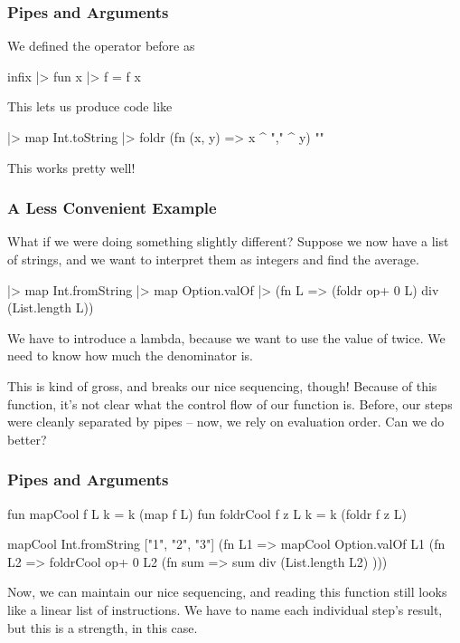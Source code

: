 \documentclass[aspectratio=169]{beamer}
\begin{document}
\begin{frame}[fragile]
  \frametitle{Pipes and Arguments}

  We defined the \code{|>} operator before as
  \begin{codeblock}
    infix |>
    fun x |> f = f x
  \end{codeblock}

  This lets us produce code like
  \begin{codeblock}
    [1, 2, 3] 
    |> map Int.toString
    |> foldr (fn (x, y) => x ^ "," ^ y) ""
  \end{codeblock}

  This works pretty well!
\end{frame}

\begin{frame}[fragile]
  \frametitle{A Less Convenient Example}

  What if we were doing something slightly different? Suppose we now have
  a list of strings, and we want to interpret them as integers and find the
  average.

  \begin{codeblock}
    ["1", "2", "3"] 
    |> map Int.fromString 
    |> map Option.valOf
    |> (fn L => (foldr op+ 0 L) div (List.length L)) 
  \end{codeblock}

  We have to introduce a lambda, because we want to use the value of
   twice. We need to know how much the denominator is.
  
  This is kind of gross, and breaks our nice sequencing, though! Because of 
  this  function, it's not clear what the control flow of our
  function is. Before, our steps were cleanly separated by pipes -- now, 
  we rely on evaluation order. Can we do better?
\end{frame}

\begin{frame}[fragile]
  \frametitle{Pipes and Arguments}

  \begin{codeblock}
    fun mapCool f L k = k (map f L) 
    fun foldrCool f z L k = k (foldr f z L) 
  \end{codeblock}

  \begin{codeblock}
    mapCool Int.fromString ["1", "2", "3"] (fn L1 => 
    mapCool Option.valOf L1                (fn L2 =>
    foldrCool op+ 0 L2                     (fn sum => 
    sum div (List.length L2)               )))
  \end{codeblock}

  Now, we can maintain our nice sequencing, and reading this function
  still looks like a linear list of instructions. We have to name each
  individual step's result, but this is a strength, in this case. 
\end{frame}
\end{document}
